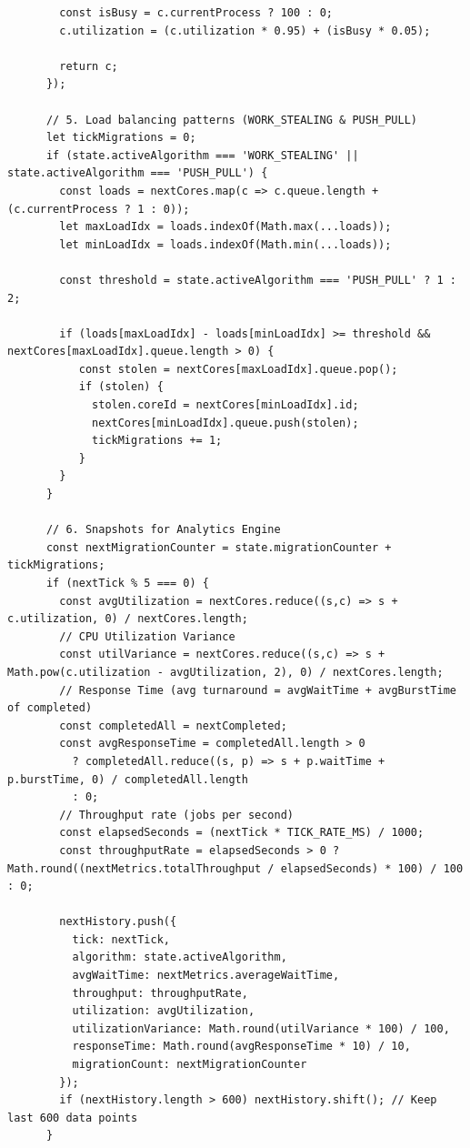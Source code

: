 \documentclass[a4paper]{article}
\begin{document}
\begin{lstlisting}
        const isBusy = c.currentProcess ? 100 : 0;
        c.utilization = (c.utilization * 0.95) + (isBusy * 0.05);

        return c;
      });

      // 5. Load balancing patterns (WORK_STEALING & PUSH_PULL)
      let tickMigrations = 0;
      if (state.activeAlgorithm === 'WORK_STEALING' || state.activeAlgorithm === 'PUSH_PULL') {
        const loads = nextCores.map(c => c.queue.length + (c.currentProcess ? 1 : 0));
        let maxLoadIdx = loads.indexOf(Math.max(...loads));
        let minLoadIdx = loads.indexOf(Math.min(...loads));
        
        const threshold = state.activeAlgorithm === 'PUSH_PULL' ? 1 : 2; 
        
        if (loads[maxLoadIdx] - loads[minLoadIdx] >= threshold && nextCores[maxLoadIdx].queue.length > 0) {
           const stolen = nextCores[maxLoadIdx].queue.pop();
           if (stolen) {
             stolen.coreId = nextCores[minLoadIdx].id;
             nextCores[minLoadIdx].queue.push(stolen);
             tickMigrations += 1;
           }
        }
      }

      // 6. Snapshots for Analytics Engine
      const nextMigrationCounter = state.migrationCounter + tickMigrations;
      if (nextTick % 5 === 0) {
        const avgUtilization = nextCores.reduce((s,c) => s + c.utilization, 0) / nextCores.length;
        // CPU Utilization Variance
        const utilVariance = nextCores.reduce((s,c) => s + Math.pow(c.utilization - avgUtilization, 2), 0) / nextCores.length;
        // Response Time (avg turnaround = avgWaitTime + avgBurstTime of completed)
        const completedAll = nextCompleted;
        const avgResponseTime = completedAll.length > 0
          ? completedAll.reduce((s, p) => s + p.waitTime + p.burstTime, 0) / completedAll.length
          : 0;
        // Throughput rate (jobs per second)
        const elapsedSeconds = (nextTick * TICK_RATE_MS) / 1000;
        const throughputRate = elapsedSeconds > 0 ? Math.round((nextMetrics.totalThroughput / elapsedSeconds) * 100) / 100 : 0;

        nextHistory.push({
          tick: nextTick,
          algorithm: state.activeAlgorithm,
          avgWaitTime: nextMetrics.averageWaitTime,
          throughput: throughputRate,
          utilization: avgUtilization,
          utilizationVariance: Math.round(utilVariance * 100) / 100,
          responseTime: Math.round(avgResponseTime * 10) / 10,
          migrationCount: nextMigrationCounter
        });
        if (nextHistory.length > 600) nextHistory.shift(); // Keep last 600 data points
      }


\end{lstlisting}
\end{document}
